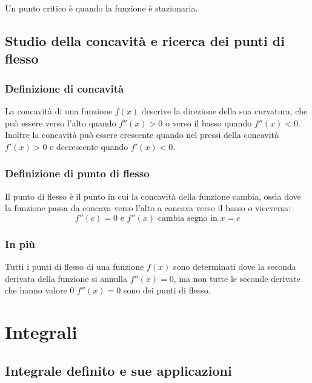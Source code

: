 \documentclass{article}
\begin{document}
Un punto critico è quando la funzione è stazionaria.


\newpage
\subsection{Studio della concavità e ricerca dei punti di flesso}
\subsubsection{Definizione di concavità}
La concavità di una funzione \(f(x)\) descrive la direzione della sua curvatura, che può
essere verso l'alto quando \(f''(x)>0\) o verso il basso quando \(f''(x)<0\).\\
Inoltre la concavità può essere crescente quando nel pressi della concavità \(f'(x)>0\) e 
decrescente quando \(f'(x)<0\).

\subsubsection{Definizione di punto di flesso}
Il punto di flesso è il punto in cui la concavità della funzione cambia, ossia dove la
funzione passa da concava verso l'alto a concava verso il basso o viceversa:
\begin{equation*}
    f''(c) = 0 \text{ e } f''(x) \text{ cambia segno in } x=c
\end{equation*}

\subsubsection{In più}
Tutti i punti di flesso di una funzione \(f(x)\) sono determinati dove la seconda derivata
della funzione si annulla \(f''(x)=0\), ma non tutte le seconde derivate che hanno valore 0
\(f''(x)=0\) sono dei punti di flesso.

\newpage
\section{Integrali}
\subsection{Integrale definito e sue applicazioni}
\end{document}
